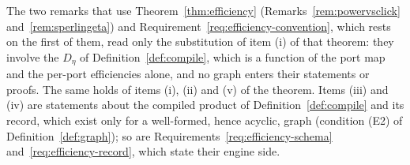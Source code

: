 
\begin{remark}
\label{rem:acyc-efficiency}
The two remarks that use Theorem~\ref{thm:efficiency}
(Remarks~\ref{rem:powervsclick} and~\ref{rem:sperlingeta}) and
Requirement~\ref{req:efficiency-convention}, which rests on the first of them,
read only the substitution of item (i) of that theorem: they involve the
 $D_\eta$ of
Definition~\ref{def:compile}, which is a function of the port map and the
per-port efficiencies alone, and no graph enters their statements or proofs.
The same holds of items (i), (ii) and (v) of the theorem. Items (iii) and (iv)
are statements about the compiled product of Definition~\ref{def:compile} and
its record, which exist only for a well-formed, hence acyclic, graph
(condition (E2) of Definition~\ref{def:graph}); so are
Requirements~\ref{req:efficiency-schema} and~\ref{req:efficiency-record},
which state their engine side.
\end{remark}

